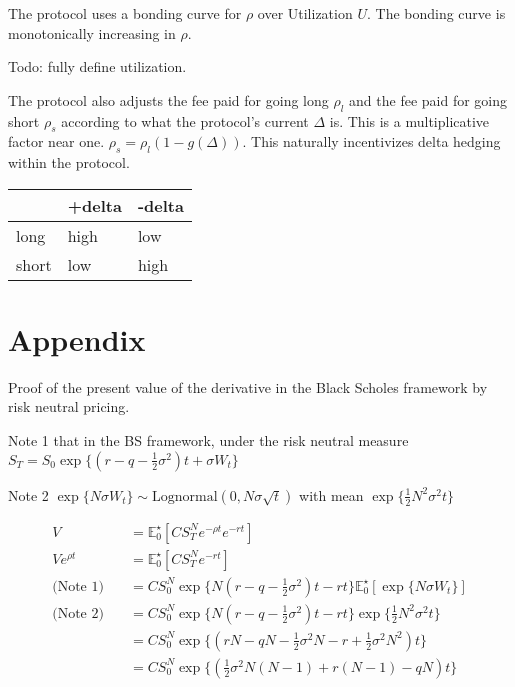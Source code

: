 \documentclass[12pt]{article}
\newcommand{\half}{\tfrac{1}{2}}
\begin{document}
    The protocol uses a bonding curve for $\rho$ over Utilization $U$. The bonding curve is monotonically increasing in $\rho$.

    Todo: fully define utilization.

    The protocol also adjusts the fee paid for going long $\rho_l$ and the fee paid for going short $\rho_s$ according to what the protocol's current $\Delta$ is. This is a multiplicative factor near one. $\rho_s = \rho_l (1 - g(\Delta))$. This naturally incentivizes delta hedging within the protocol.

    \begin{center}
        \begin{tabular}{l||l|l}
            & +delta & -delta \\ \hline \hline
            long  & high   & low    \\ \hline
            short & low    & high
        \end{tabular}
    \end{center}


    \section{Appendix}

    Proof of the present value of the derivative in the Black Scholes framework by risk neutral pricing.

    Note 1 that in the BS framework, under the risk neutral measure $S_T = S_0 \exp \{ (r - q -\half\sigma^2)t + \sigma W_t \}$

    Note 2 $\exp \{ N\sigma W_t \} \sim \text{Lognormal}(0, N \sigma \sqrt{t})$ with mean $\exp \{ \half N^2 \sigma^2 t \}$

    \begin{align*}
        V  &= \mathbb{E}_0^{\star} \left[ C S_T^N e^{-\rho t} e^{-rt} \right] \\
        V e^{\rho t} &= \mathbb{E}_0^{\star} \left[ C S_T^N e^{-rt} \right] \\
        \text{(Note 1)}\quad&= C S_0^N  \exp \{ N(r - q -\half\sigma^2)t - rt \} \mathbb{E}_0^{\star} \left[ \exp \{ N\sigma W_t \} \right] \\
        \text{(Note 2)}\quad&= C S_0^N  \exp \{ N(r - q -\half\sigma^2)t - rt \} \exp \{ \half N^2 \sigma^2 t \} \\
        &= C S_0^N  \exp \{(rN - qN -\half\sigma^2 N - r + \half\sigma^2 N^2) t\} \\
        &= C S_0^N  \exp \{( \half\sigma^2 N (N-1) + r(N-1) - qN ) t\}
    \end{align*}
\end{document}
